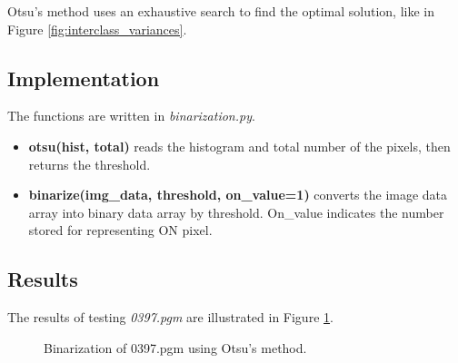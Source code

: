 \documentclass[paper=a4, fontsize=11pt]{scrartcl}
\numberwithin{equation}{section}		%
\numberwithin{figure}{section}			%
\numberwithin{table}{section}				%
\begin{document}
Otsu's method uses an exhaustive search to find the optimal solution, like in Figure \ref{fig:interclass_variances}. 

\subsection{Implementation}

The functions are written in \emph{binarization.py}.

\begin{itemize}
\item \textbf{ otsu(hist, total) } reads the histogram and total number of the pixels, then returns the threshold.
\item \textbf{ binarize(img\_data, threshold, on\_value=1) } converts the image data array into binary data array by threshold.
On\_value indicates the number stored for representing ON pixel.
\end{itemize}

\subsection{Results}


The results of testing \emph{0397.pgm} are illustrated in Figure \ref{fig:binary:01}.

\begin{figure}[h]
\centering
{}
\caption{Binarization of 0397.pgm using Otsu's method.}\label{fig:binary:01}
\end{figure}
\end{document}
